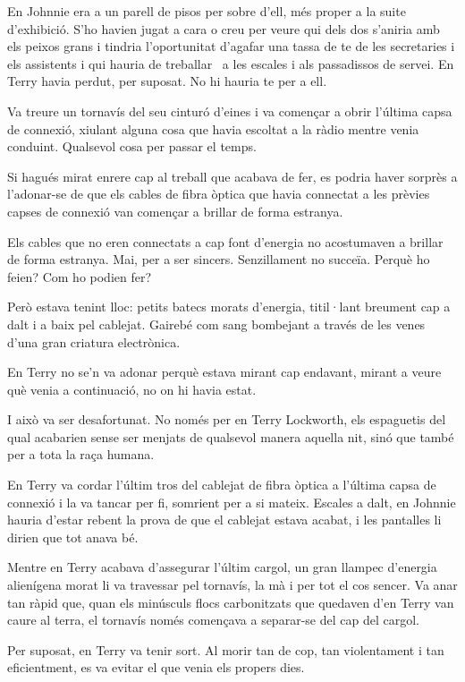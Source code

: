 En Johnnie era a un parell de pisos per sobre d'ell, més proper a la
suite d'exhibició. S'ho havien jugat a cara o creu per veure qui dels
dos s'aniria amb els peixos grans i tindria l'oportunitat d'agafar una
tassa de te de les secretaries i els assistents i qui hauria de
treballar ~a les escales i als passadissos de servei. En Terry havia
perdut, per suposat. No hi hauria te per a ell.

Va treure un tornavís del seu cinturó d'eines i va començar a obrir
l'última capsa de connexió, xiulant alguna cosa que havia escoltat a la
ràdio mentre venia conduint. Qualsevol cosa per passar el temps.

Si hagués mirat enrere cap al treball que acabava de fer, es podria
haver sorprès a l'adonar-se de que els cables de fibra òptica que havia
connectat a les prèvies capses de connexió van començar a brillar de
forma estranya.

Els cables que no eren connectats a cap font d'energia no acostumaven a
brillar de forma estranya. Mai, per a ser sincers. Senzillament no
succeïa. Perquè ho feien? Com ho podien fer?

Però estava tenint lloc: petits batecs morats d'energia, titil·lant
breument cap a dalt i a baix pel cablejat. Gairebé com sang bombejant a
través de les venes d'una gran criatura electrònica.

En Terry no se'n va adonar perquè estava mirant cap endavant, mirant a
veure què venia a continuació, no on hi havia estat.

I això va ser desafortunat. No només per en Terry Lockworth, els
espaguetis del qual acabarien sense ser menjats de qualsevol manera
aquella nit, sinó que també per a tota la raça humana.

En Terry va cordar l'últim tros del cablejat de fibra òptica a l'última
capsa de connexió i la va tancar per fi, somrient per a si mateix.
Escales a dalt, en Johnnie hauria d'estar rebent la prova de que el
cablejat estava acabat, i les pantalles li dirien que tot anava bé.

Mentre en Terry acabava d'assegurar l'últim cargol, un gran llampec
d'energia alienígena morat li va travessar pel tornavís, la mà i per tot
el cos sencer. Va anar tan ràpid que, quan els minúsculs flocs
carbonitzats que quedaven d'en Terry van caure al terra, el tornavís
només començava a separar-se del cap del cargol.

Per suposat, en Terry va tenir sort. Al morir tan de cop, tan
violentament i tan eficientment, es va evitar el que venia els propers
dies.

